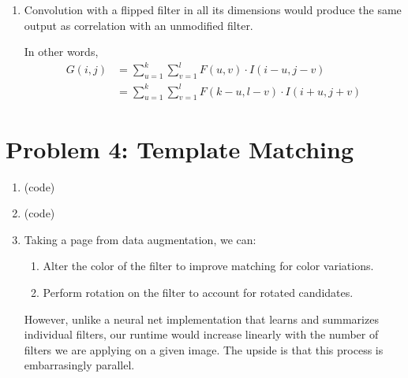 \documentclass{article}
\begin{document}
\begin{enumerate}[label=(\roman*)]
\item %
Convolution with a flipped filter in all its dimensions would produce the same output as correlation with an unmodified filter.

In other words,
\begin{equation}
\begin{aligned}
G(i,j) &= \sum_{u=1}^k\sum_{v=1}^l F(u,v)\cdot I(i-u, j-v) \\
&= \sum_{u=1}^k\sum_{v=1}^l F(k-u, l-v) \cdot I(i+u, j+v)
\end{aligned}
\end{equation}


\end{enumerate}

\section*{Problem 4: Template Matching}
\begin{enumerate}[label=(\roman*)]
\item %
(code)

\item %
(code)

\item %
Taking a page from data augmentation, we can:

\begin{enumerate}
\item Alter the color of the filter to improve matching for color variations.
\item Perform rotation on the filter to account for rotated candidates.
\end{enumerate}

However, unlike a neural net implementation that learns and summarizes individual filters, our runtime would increase linearly with the number of filters we are applying on a given image. The upside is that this process is embarrasingly parallel.
	
\end{enumerate}
\end{document}
